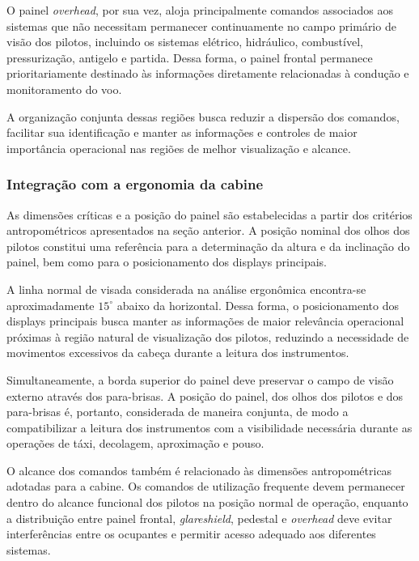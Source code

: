 O painel \textit{overhead}, por sua vez, aloja principalmente comandos
associados aos sistemas que não necessitam permanecer continuamente no campo
primário de visão dos pilotos, incluindo os sistemas elétrico, hidráulico,
combustível, pressurização, antigelo e partida. Dessa forma, o painel frontal
permanece prioritariamente destinado às informações diretamente relacionadas à
condução e monitoramento do voo.

A organização conjunta dessas regiões busca reduzir a dispersão dos comandos,
facilitar sua identificação e manter as informações e controles de maior
importância operacional nas regiões de melhor visualização e alcance.


\subsubsection{Integração com a ergonomia da cabine}

As dimensões críticas e a posição do painel são estabelecidas a partir dos
critérios antropométricos apresentados na seção anterior. A posição nominal dos
olhos dos pilotos constitui uma referência para a determinação da altura e da
inclinação do painel, bem como para o posicionamento dos displays principais.

A linha normal de visada considerada na análise ergonômica encontra-se
aproximadamente $15^{\circ}$ abaixo da horizontal. Dessa forma, o posicionamento
dos displays principais busca manter as informações de maior relevância
operacional próximas à região natural de visualização dos pilotos, reduzindo a
necessidade de movimentos excessivos da cabeça durante a leitura dos
instrumentos.

Simultaneamente, a borda superior do painel deve preservar o campo de visão
externo através dos para-brisas. A posição do painel, dos olhos dos pilotos e
dos para-brisas é, portanto, considerada de maneira conjunta, de modo a
compatibilizar a leitura dos instrumentos com a visibilidade necessária durante
as operações de táxi, decolagem, aproximação e pouso.

O alcance dos comandos também é relacionado às dimensões antropométricas
adotadas para a cabine. Os comandos de utilização frequente devem permanecer
dentro do alcance funcional dos pilotos na posição normal de operação, enquanto
a distribuição entre painel frontal, \textit{glareshield}, pedestal e
\textit{overhead} deve evitar interferências entre os ocupantes e permitir
acesso adequado aos diferentes sistemas.



